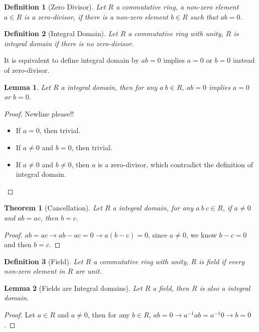 \documentclass[14pt]{extarticle}
\newtheorem{theorem}{Theorem}[section]
\newtheorem{lemma}{Lemma}[section]
\newtheorem{definition}{Definition}[section]
\newcommand{\inv}[1]{#1^{-1}}
\newcommand{\1}{\{e\}}
\begin{document}
\begin{definition}[Zero Divisor]
  Let $R$ a commutative ring, a non-zero element $a \in R$ is a zero-divisor,
  if there is a non-zero element $b \in R$ such that $ab = 0$.
\end{definition}

\begin{definition}[Integral Domain]
  Let $R$ a commutative ring with unity, $R$ is integral domain if there is no zero-divisor.
\end{definition}

It is equivalent to define integral domain by $ab = 0$ implies $a = 0$ or $b = 0$
instead of zero-divisor.

\begin{lemma}
  Let $R$ a integral domain, then for any $a \ b \in R$, $ab = 0$ implies $a = 0$ or $b = 0$.
\end{lemma}
\begin{proof}
  Newline please!!
  \begin{itemize}
    \item If $a = 0$, then trivial.
    \item If $a \neq 0$ and $b = 0$, then trivial.
    \item If $a \neq 0$ and $b \neq 0$, then $a$ is a zero-divisor, 
      which contradict the definition of integral domain.
  \end{itemize}
\end{proof}

\begin{theorem}[Cancellation]
  \label{theorem:13.1}
  Let $R$ a integral domain, for any $a \ b \ c \in R$, 
  if $a \neq 0$ and $ab = ac$, then $b = c$.
\end{theorem}
\begin{proof}
  $ab = ac \rightarrow ab - ac = 0 \rightarrow a(b - c) = 0$,
  since $a \neq 0$, we know $b - c = 0$ and then $b = c$.
\end{proof}

\begin{definition}[Field]
  Let $R$ a commutative ring with unity, 
  $R$ is field if every non-zero element in $R$ are unit.
\end{definition}

\begin{lemma}[Fields are Integral domains]
  Let $R$ a field, then $R$ is also a integral domain.
\end{lemma}
\begin{proof}
  Let $a \in R$ and $a \neq 0$, then for any $b \in R$,
  $ab = 0 \rightarrow \inv{a}ab = \inv{a}0 \rightarrow b = 0$.
\end{proof}
\end{document}
